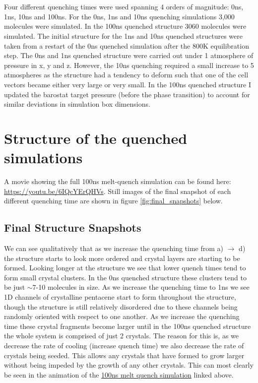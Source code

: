 \\\\
Four different quenching times were used spanning 4 orders of magnitude: 0ns, 1ns, 10ns and 100ns. For the 0ns, 1ns and 10ns quenching simulations 3,000 molecules were simulated. In the 100ns quenched structure 3060 molecules were simulated. The initial structure for the 1ns and 10ns quenched structures were taken from a restart of the 0ns quenched simulation after the 800K equilibration step. The 0ns and 1ns quenched structure were carried out under 1 atmosphere of pressure in x, y and z. However, the 10ns quenching required a small increase to 5 atmospheres as the structure had a tendency to deform such that one of the cell vectors became either very large or very small. In the 100ns quenched structure I updated the barostat target pressure (before the phase transition) to account for similar deviations in simulation box dimensions.
\section{Structure of the quenched simulations}
A movie showing the full 100ns melt-quench simulation can be found here: \href{https://youtu.be/6IQcYErQHVs}{https://youtu.be/6IQcYErQHVs}. Still images of the final snapshot of each different quenching time are shown in figure \ref{fig:final_snapshots} below.
\subsection{Final Structure Snapshots}
\noindent We can see qualitatively that as we increase the quenching time from a) $\rightarrow$ d) the structure starts to look more ordered and crystal layers are starting to be formed. Looking longer at the structure we see that lower quench times tend to form small crystal clusters. In the 0ns quenched structure these clusters tend to be just $\sim$7-10 molecules in size. As we increase the quenching time to 1ns we see 1D channels of crystalline pentacene start to form throughout the structure, though the structure is still relatively disordered due to these channels being randomly oriented with respect to one another. As we increase the quenching time these crystal fragments become larger until in the 100ns quenched structure the whole system is comprised of just 2 crystals. The reason for this is, as we decrease the rate of cooling (increase quench time) we also decrease the rate of crystals being seeded. This allows any crystals that have formed to grow larger without being impeded by the growth of any other crystals. This can most clearly be seen in the animation of the \href{https://youtu.be/6IQcYErQHVs}{100ns melt quench simulation} linked above.

